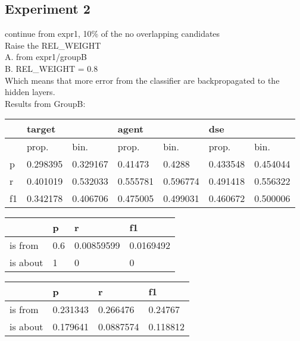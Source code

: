 \documentclass[a4paper, 12pt]{article}
\begin{document}
\subsection{Experiment 2}
continue from expr1, 10\% of the no overlapping candidates\\
Raise the REL\_WEIGHT\\
A. from expr1/groupB\\
B. REL\_WEIGHT = 0.8 \\
Which means that more error from the classifier are backpropagated to the
hidden layers.\\
Results from GroupB:\\
\begin{table}[h!]
\centering
{}

\begin{tabular}{l|ll|ll|ll}
\hline
   & \multicolumn{2}{l}{target} & \multicolumn{2}{l}{agent} & \multicolumn{2}{l}{dse} \\ \hline
   & prop.& bin.& prop.& bin.& prop.& bin.\\
 \hline
p  &0.298395&0.329167&  0.41473 &   0.4288 &0.433548  & 0.454044  \\
r  &0.401019&0.532033& 0.555781 & 0.596774 &0.491418  & 0.556322  \\
f1 &0.342178&0.406706& 0.475005 & 0.499031 &0.460672  & 0.500006  \\ \hline
\end{tabular}

\centering
{}

\begin{tabular}{l|l|l|l}
\hline
         & p & r & f1    \\\hline
is from  & 0.6& 0.00859599&  0.0169492\\
is about &1& 0& 0\\
\hline
\end{tabular}
\centering
{}

\begin{tabular}{l|l|l|l}
\hline
         & p & r & f1    \\\hline
is from  & 0.231343& 0.266476&  0.24767\\
is about &0.179641& 0.0887574&  0.118812\\
\hline
\end{tabular}
\end{table}
\end{document}
